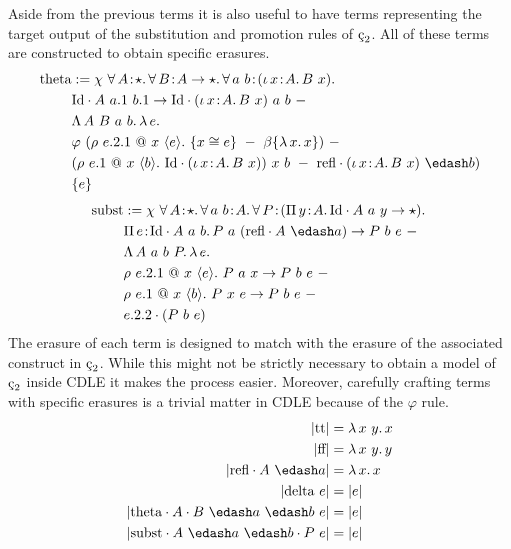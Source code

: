 Aside from the previous terms it is also useful to have terms representing the target output of the substitution and promotion rules of $\ced$.
All of these terms are constructed to obtain specific erasures.
\begin{align*}
    \ctheta &:= \chi\ 
        \abs{\forall}{A}{\star}{
            \abs{\forall}{B}{A \to \star}{
                \abs{\forall}{a\ b}{(\abs{\iota}{x}{A}{B\ x})}{
                    \\ &\cId \cdot A\ a.1\ b.1 \to \cId \cdot (\abs{\iota}{x}{A}{B\ x})\ a\ b
                }
            }
        }\ -
        \\ &\absu{\Lambda}{A\ B\ a\ b}{
            \absu{\lambda}{e}{
                \\ &\varphi\ (\rho\ e.2.1\ @\ x\ \langle e \rangle.\ \{ x \cong e \}\ -\ \beta\{ \absu{\lambda}{x}{x} \})\ -
                \\ &(\rho\ e.1\ @\ x\ \langle b \rangle.\ \cId \cdot (\abs{\iota}{x}{A}{B\ x}))\ x\ b\ -\ \crefl \cdot (\abs{\iota}{x}{A}{B\ x})\ \edash b)
                \\ &\{ e \} 
            }
        }
\end{align*}
\begin{align*}
    \csubst &:= \chi\ 
        \abs{\forall}{A}{\star}{
            \abs{\forall}{a\ b}{A}{
                \abs{\forall}{P}{ (\abs{\Pi}{y}{A}{\cId \cdot A\ a\ y \to \star}) }{
                    \\ &\abs{\Pi}{e}{\cId \cdot A\ a\ b}{
                        P\ a\ (\crefl \cdot A\ \edash a) \to P\ b\ e
                    }
                }
            }
        }\ -
        \\ &\absu{\Lambda}{A\ a\ b\ P}{
            \absu{\lambda}{e}{
                \\ &\rho\ e.2.1\ @\ x\ \langle e \rangle.\ P\ a\ x \to P\ b\ e\ -\
                \\ &\rho\ e.1\ @\ x\ \langle b \rangle.\ P\ x\ e \to P\ b\ e\ -\
                \\ &e.2.2 \cdot (P\ b\ e)
            }
    }
\end{align*}
The erasure of each term is designed to match with the erasure of the associated construct in $\ced$.
While this might not be strictly necessary to obtain a model of $\ced$ inside CDLE it makes the process easier.
Moreover, carefully crafting terms with specific erasures is a trivial matter in CDLE because of the $\varphi$ rule.
\begin{align*}
    |\ctt| &= \absu{\lambda}{x\ y}{x} \\
    |\cff| &= \absu{\lambda}{x\ y}{y} \\
    |\crefl \cdot A\ \edash a| &= \absu{\lambda}{x}{x} \\
    |\cdelta\ e| &= |e| \\
    |\ctheta \cdot A \cdot B\ \edash a\ \edash b\ e| &= |e| \\
    |\csubst \cdot A\ \edash a\ \edash b \cdot P\ e| &= |e|
\end{align*}
